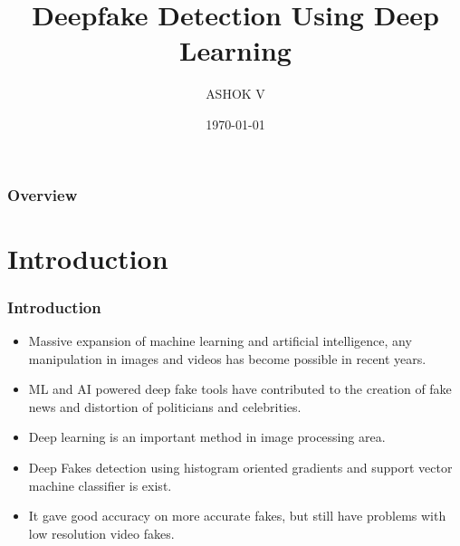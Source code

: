 \documentclass{beamer}
\title[Deepfake Detection Using DL]{Deepfake Detection Using Deep Learning} %
\author[ASHOK]{ASHOK V \\
	\medskip
	\text{MDL20CSIP02}
}
\institute[MEC] %
{M.Tech Computer Science and Engineering \\
	with Specialisation in Image Processing \\
	\medskip
	Department of Computer Engineering \\
	\medskip
\text{Government Model Engineering College Thrikkakara}
}
\date{\today} %
\begin{document}
\begin{frame}
\titlepage %
\end{frame}

\begin{frame}
\frametitle{Overview} %
\tableofcontents %
\end{frame}



\section{Introduction}
\begin{frame}
\frametitle{Introduction}
\begin{itemize}
	\item Massive expansion of machine learning and	artiﬁcial intelligence, any manipulation in images and videos has become possible in recent years.
	\item ML and AI powered deep fake tools have contributed to the creation of fake news and distortion of politicians and celebrities.
	\item Deep learning is an important method in image processing area.
	\item Deep Fakes detection using histogram oriented gradients and support vector machine classifier is exist.
	\item It gave good accuracy on more accurate fakes, but still have problems with low resolution video fakes.
\end{itemize}
\end{frame}
\end{document}
